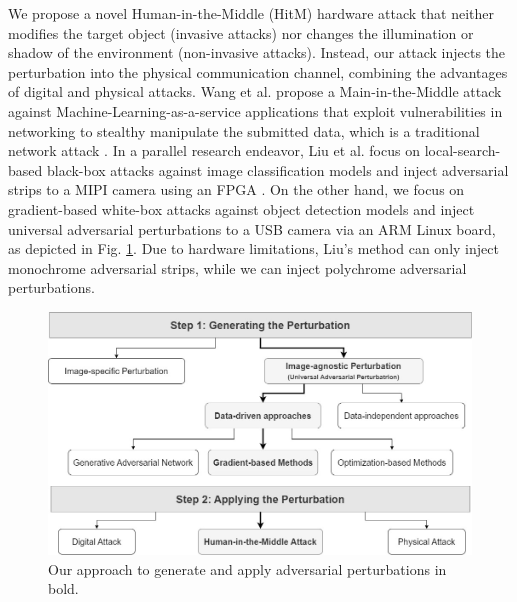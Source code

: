 
We propose a novel Human-in-the-Middle (HitM)  hardware attack that neither modifies the target object (invasive attacks) nor changes the illumination or shadow of the environment (non-invasive attacks). Instead, our attack injects the perturbation into the physical communication channel, combining the advantages of digital and physical attacks. Wang et al. propose a Main-in-the-Middle attack against Machine-Learning-as-a-service applications that exploit vulnerabilities in networking to stealthy manipulate the submitted data, which is a traditional network attack \cite{wang2020man}. In a parallel research endeavor, Liu et al. focus on local-search-based black-box attacks against image classification models and inject adversarial strips to a MIPI camera using an FPGA \cite{liu2022practical}. On the other hand, we focus on gradient-based white-box attacks against object detection models and inject universal adversarial perturbations to a USB camera via an ARM Linux board, as depicted in Fig. \ref{fig:attack}. Due to hardware limitations, Liu's method can only inject monochrome adversarial strips, while we can inject polychrome adversarial perturbations. 




\begin{figure}[bt]
    \centering
    \includegraphics[width=0.9\linewidth]{figures/chapter_detection/hardware/attack.jpg}
    \caption{Our approach to generate and apply adversarial perturbations in bold.}
    \label{fig:attack}
\end{figure}

